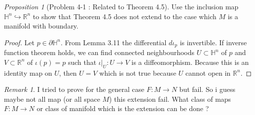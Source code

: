 \documentclass[a4paper]{article}
\theoremstyle{remark}
\newtheorem*{remark}{Remark}
\newtheorem{prop}{Proposition}
\newcommand{\rn}{\mathbb{R}^n} %
\newcommand{\hn}{\mathbb{H}^n} %
\newcommand{\map}{\rightarrow} %
\begin{document}
\begin{prop}[Problem 4-1 \cite{LeeSM} : Related to Theorem 4.5]
Use the inclusion map $\mathbb{H}^n \hookrightarrow \mathbb{R}^n$ to show that Theorem 4.5 does not extend to the case which $M$ is a manifold with boundary. 
\end{prop}
\begin{proof}
Let $p \in \partial \hn$. From Lemma 3.11 the differential $d\iota_p$ is invertible. If inverse function theorem holds, we can find connected neighbourhoods $U \subset \hn$ of $p$ and $V \subset \rn$ of $\iota(p)=p$ such that $\iota|_{U} : U \map V$ is a diffeomorphism. Because this is an identity map on $U$, then $U=V$ which is not true because $U$ cannot open in $\rn$. 
\end{proof}
\begin{remark}
I tried to prove for the general case $F : M \map N$ but fail. So i guess maybe not all map (or all space $M$) this extension fail. What class of maps $F : M \to N$ or class of manifold which is the extension can be done ?
\end{remark}
\end{document}
